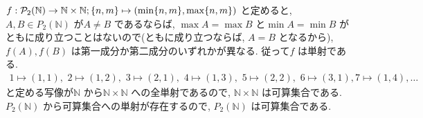 \documentclass[10pt, fleqn, label-section=none]{bxjsarticle}
\theoremstyle{definition}
\newcommand{\cbra}[1]{\mleft\{#1\mright\}}
\renewcommand{\;}{\, ; \,}
\begin{document}
$f: \mathcal P_2 (\mathbb N) \rightarrow \mathbb N \times \mathbb N  ;  \cbra{n, m} \mapsto (\min \cbra{n, m}  , \max \cbra{n, m})$ と定めると, $A, B \in P_2 (\mathbb N)$ が$A \neq B$ であるならば, $\max A = \max B$ と$\min A = \min B$ がともに成り立つことはないので(ともに成り立つならば, $A = B$ となるから), $f(A), f(B)$ は第一成分か第二成分のいずれかが異なる. 従って$f$ は単射である. 
\begin{align*} 1 \mapsto (1, 1), \,\, 2 \mapsto (1, 2), \,\, 3 \mapsto (2, 1), \,\, 4 \mapsto(1, 3), \,\, 5 \mapsto (2,2), \,\, 6 \mapsto (3, 1), 7 \mapsto(1, 4), \ldots  \end{align*}  
と定める写像が$\mathbb N $ から$\mathbb N \times \mathbb N$ への全単射であるので, $\mathbb N \times \mathbb N$ は可算集合である. $P_2 ( \mathbb N) $ から可算集合への単射が存在するので, $P_2 (\mathbb N) $ は可算集合である. 
 
\end{document}
